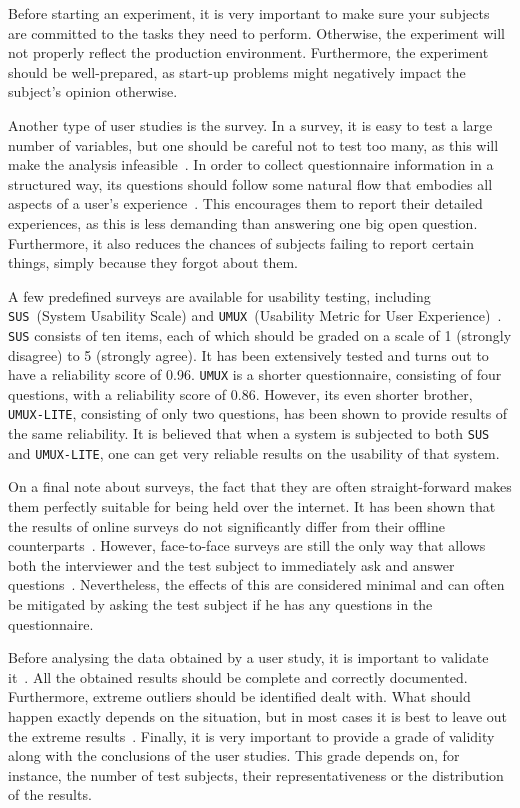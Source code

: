 Before starting an experiment, it is very important to make sure your subjects are committed to the tasks they need to perform. Otherwise, the experiment will not properly reflect the production environment. Furthermore, the experiment should be well-prepared, as start-up problems might negatively impact the subject's opinion otherwise.

Another type of user studies is the survey. In a survey, it is easy to test a large number of variables, but one should be careful not to test too many, as this will make the analysis infeasible~\cite{wohlin2003empirical}. In order to collect questionnaire information in a structured way, its questions should follow some natural flow that embodies all aspects of a user's experience~\cite{tuch2013analyzing}. This encourages them to report their detailed experiences, as this is less demanding than answering one big open question. Furthermore, it also reduces the chances of subjects failing to report certain things, simply because they forgot about them.

A few predefined surveys are available for usability testing, including \verb|SUS|~(System Usability Scale) and \verb|UMUX|~(Usability Metric for User Experience)~\cite{lewis2013umux}. \verb|SUS| consists of ten items, each of which should be graded on a scale of 1 (strongly disagree) to 5 (strongly agree). It has been extensively tested and turns out to have a reliability score of 0.96. \verb|UMUX| is a shorter questionnaire, consisting of four questions, with a reliability score of 0.86. However, its even shorter brother, \verb|UMUX-LITE|, consisting of only two questions, has been shown to provide results of the same reliability. It is believed that when a system is subjected to both \verb|SUS| and \verb|UMUX-LITE|, one can get very reliable results on the usability of that system.

On a final note about surveys, the fact that they are often straight-forward makes them perfectly suitable for being held over the internet. It has been shown that the results of online surveys do not significantly differ from their offline counterparts~\cite{komarov2013crowdsourcing}. However, face-to-face surveys are still the only way that allows both the interviewer and the test subject to immediately ask and answer questions~\cite{wohlin2003empirical}. Nevertheless, the effects of this are considered minimal and can often be mitigated by asking the test subject if he has any questions in the questionnaire.

Before analysing the data obtained by a user study, it is important to validate it~\cite{wohlin2003empirical}. All the obtained results should be complete and correctly documented. Furthermore, extreme outliers should be identified dealt with. What should happen exactly depends on the situation, but in most cases it is best to leave out the extreme results~\cite{komarov2013crowdsourcing}. Finally, it is very important to provide a grade of validity along with the conclusions of the user studies. This grade depends on, for instance, the number of test subjects, their representativeness or the distribution of the results.
